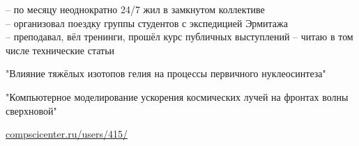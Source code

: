 \begin{multicols}{2}
 \givenskill


 \givenskill
\end{multicols}

    \cvtag{\LaTeX}

\divider


 -- по месяцу неоднократно 24/7 жил в замкнутом коллективе\\
 -- организовал поездку группы студентов с экспедицией Эрмитажа\\
 -- преподавал, вёл тренинги, прошёл курс публичных выступлений
 -- читаю в том числе технические статьи















\medskip
{}
"Влияние тяжёлых изотопов гелия на процессы первичного нуклеосинтеза"

\divider

"Компьютерное моделирование ускорения космических лучей на фронтах волны сверхновой"
\divider

\href{https://compscicenter.ru/users/415/}{compscicenter.ru/users/415/}
